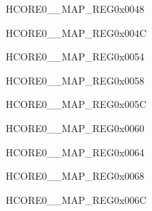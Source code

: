 \begin{register}{H}{CORE0\_\_MAP\_REG}{0x0048}\label{regdesc:CORE0LPSWINTMAPREG}
\end{register}\vspace{-3em}


\begin{register}{H}{CORE0\_\_MAP\_REG}{0x004C}\label{regdesc:CORE0LPSYSREGINTMAPREG}
\end{register}\vspace{-3em}




\begin{register}{H}{CORE0\_\_MAP\_REG}{0x0054}\label{regdesc:CORE0SYSICMINTMAPREG}
\end{register}\vspace{-3em}


\begin{register}{H}{CORE0\_\_MAP\_REG}{0x0058}\label{regdesc:CORE0USBDEVICEINTMAPREG}
\end{register}\vspace{-3em}


\begin{register}{H}{CORE0\_\_MAP\_REG}{0x005C}\label{regdesc:CORE0SDIOHOSTINTMAPREG}
\end{register}\vspace{-3em}


\begin{register}{H}{CORE0\_\_MAP\_REG}{0x0060}\label{regdesc:CORE0AXIDMACINTMAPREG}
\end{register}\vspace{-3em}


\begin{register}{H}{CORE0\_\_MAP\_REG}{0x0064}\label{regdesc:CORE0SPI2INTMAPREG}
\end{register}\vspace{-3em}


\begin{register}{H}{CORE0\_\_MAP\_REG}{0x0068}\label{regdesc:CORE0SPI3INTMAPREG}
\end{register}\vspace{-3em}


\begin{register}{H}{CORE0\_\_MAP\_REG}{0x006C}\label{regdesc:CORE0I2S0INTMAPREG}
\end{register}\vspace{-3em}



